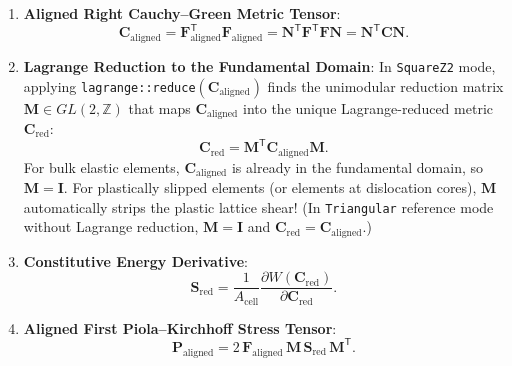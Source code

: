 \documentclass[11pt,a4paper]{article}
\newcommand{\Z}{\mathbb{Z}}
\newcommand{\T}{^{\mathsf T}}
\newcommand{\code}[1]{\texttt{#1}}
\begin{document}
\begin{enumerate}
  \item \textbf{Aligned Right Cauchy--Green Metric Tensor}:
  \begin{equation}
    \mathbf{C}_{\text{aligned}} = \mathbf{F}_{\text{aligned}}\T \mathbf{F}_{\text{aligned}}
    = \mathbf{N}\T \mathbf{F}\T \mathbf{F} \mathbf{N}
    = \mathbf{N}\T \mathbf{C} \mathbf{N}.
  \end{equation}

  \item \textbf{Lagrange Reduction to the Fundamental Domain}:
  In \code{SquareZ2} mode, applying \code{lagrange::reduce}$(\mathbf{C}_{\text{aligned}})$ finds the unimodular reduction matrix $\mathbf{M} \in GL(2,\Z)$ that maps $\mathbf{C}_{\text{aligned}}$ into the unique Lagrange-reduced metric $\mathbf{C}_{\text{red}}$:
  \begin{equation}
    \mathbf{C}_{\text{red}} = \mathbf{M}\T \mathbf{C}_{\text{aligned}} \mathbf{M}.
  \end{equation}
  For bulk elastic elements, $\mathbf{C}_{\text{aligned}}$ is already in the fundamental domain, so $\mathbf{M} = \mathbf{I}$. For plastically slipped elements (or elements at dislocation cores), $\mathbf{M}$ automatically strips the plastic lattice shear! (In \code{Triangular} reference mode without Lagrange reduction, $\mathbf{M} = \mathbf{I}$ and $\mathbf{C}_{\text{red}} = \mathbf{C}_{\text{aligned}}$.)

  \item \textbf{Constitutive Energy Derivative}:
  \begin{equation}
    \mathbf{S}_{\text{red}} = \frac{1}{A_{\text{cell}}} \frac{\partial W(\mathbf{C}_{\text{red}})}{\partial \mathbf{C}_{\text{red}}}.
  \end{equation}

  \item \textbf{Aligned First Piola--Kirchhoff Stress Tensor}:
  \begin{equation}
    \boxed{
    \mathbf{P}_{\text{aligned}} = 2\,\mathbf{F}_{\text{aligned}}\,\mathbf{M}\,\mathbf{S}_{\text{red}}\,\mathbf{M}\T.
    }
    \label{eq:P_aligned}
  \end{equation}


\end{enumerate}
\end{document}

